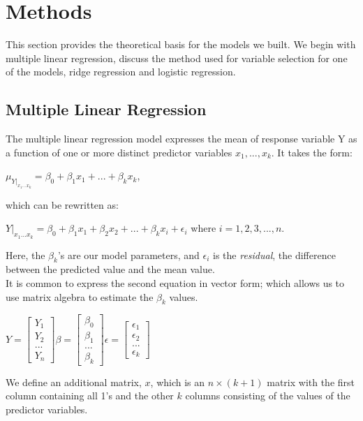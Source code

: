 \chapter{Methods}
This section provides the theoretical basis for the models we built. We begin with multiple linear regression, discuss the method used for variable selection for one of the models, ridge regression and logistic regression.
\section*{Multiple Linear Regression}
The multiple linear regression model expresses the mean of response variable Y as a function of one or more distinct predictor variables $x_1,...,x_k$. It takes the form: 
\begin{center}
	$\mu_{Y|_{x_1...x_k}} = \beta_0 + \beta_1x_1 + ...+ \beta_kx_k$,
\end{center}
which can be rewritten as: 
\begin{center}
	$Y|_{x_1...x_k} = \beta_0 + \beta_1x_1 + \beta_2x_2 + ... + \beta_kx_i + \epsilon_i$ where $i = 1,2,3,...,n$.
\end{center}
Here, the $\beta_k$'s are our model parameters, and $\epsilon_i$ is the \textit{residual}, the difference between the predicted value and the mean value. \\
It is common to express the second equation in vector form; which allows us to use matrix algebra to estimate the $\beta_k$ values.
\begin{center}$
	Y = \begin{bmatrix}
		Y_1 \\
		Y_2 \\
		... \\
		Y_n
	\end{bmatrix} \beta = \begin{bmatrix}
	\beta_0 \\
	\beta_1 \\
	... \\
	\beta_k
	\end{bmatrix} \epsilon = \begin{bmatrix}
	\epsilon_1 \\
	\epsilon_2 \\
	... \\
	\epsilon_k
	\end{bmatrix} 
$\end{center}
We define an additional matrix, $x$, which is an $n \times (k+1)$ matrix with the first column containing all 1's and the other $k$ columns consisting of the values of the predictor variables.
